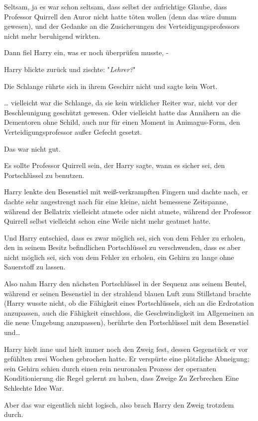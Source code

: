 {Seltsam, ja es war schon seltsam, dass selbst der aufrichtige Glaube, dass Professor Quirrell den Auror nicht hatte töten wollen (denn das wäre dumm gewesen), und der Gedanke an die Zusicherungen des Verteidigungsprofessors nicht mehr beruhigend wirkten.

Dann fiel Harry ein, was er noch überprüfen musste, -

Harry blickte zurück und zischte: "\emph{Lehrer?}"

Die Schlange rührte sich in ihrem Geschirr nicht und sagte kein Wort.

… vielleicht war die Schlange, da sie kein wirklicher Reiter war, nicht vor der Beschleunigung geschützt gewesen. Oder vielleicht hatte das Annähern an die Dementoren ohne Schild, auch nur für einen Moment in Animagus-Form, den Verteidigungsprofessor außer Gefecht gesetzt.

Das war nicht gut.

Es sollte Professor Quirrell sein, der Harry sagte, wann es sicher sei, den Portschlüssel zu benutzen.

Harry lenkte den Besenstiel mit weiß-verkrampften Fingern und dachte nach, er dachte sehr angestrengt nach für eine kleine, nicht bemessene Zeitspanne, während der Bellatrix vielleicht atmete oder nicht atmete, während der Professor Quirrell selbst vielleicht schon eine Weile nicht mehr geatmet hatte.

Und Harry entschied, dass es zwar möglich sei, sich von dem Fehler zu erholen, den in seinem Besitz befindlichen Portschlüssel zu verschwenden, dass es aber nicht möglich sei, sich von dem Fehler zu erholen, ein Gehirn zu lange ohne Sauerstoff zu lassen.

Also nahm Harry den nächsten Portschlüssel in der Sequenz aus seinem Beutel, während er seinen Besenstiel in der strahlend blauen Luft zum Stillstand brachte (Harry wusste nicht, ob die Fähigkeit eines Portschlüssels, sich an die Erdrotation anzupassen, auch die Fähigkeit einschloss, die Geschwindigkeit im Allgemeinen an die neue Umgebung anzupassen), berührte den Portschlüssel mit dem Besenstiel und…

Harry hielt inne und hielt immer noch den Zweig fest, dessen Gegenstück er vor gefühlten zwei Wochen gebrochen hatte. Er verspürte eine plötzliche Abneigung; sein Gehirn schien durch einen rein neuronalen Prozess der operanten Konditionierung die Regel gelernt zu haben, dass Zweige Zu Zerbrechen Eine Schlechte Idee War.

Aber das war eigentlich nicht logisch, also brach Harry den Zweig trotzdem durch.

}
